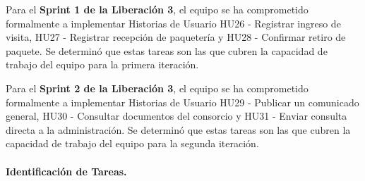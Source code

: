 Para el \textbf{Sprint 1 de la Liberación 3}, el equipo se ha comprometido formalmente a implementar Historias de Usuario HU26 - Registrar ingreso de visita, HU27 - Registrar recepción de paquetería y HU28 - Confirmar retiro de paquete. Se determinó que estas tareas son las que cubren la capacidad de trabajo del equipo para la primera iteración.

Para el \textbf{Sprint 2 de la Liberación 3}, el equipo se ha comprometido formalmente a implementar Historias de Usuario HU29 - Publicar un comunicado general, HU30 - Consultar documentos del consorcio y HU31 - Enviar consulta directa a la administración. Se determinó que estas tareas son las que cubren la capacidad de trabajo del equipo para la segunda iteración.

\paragraph{Identificación de Tareas.}

